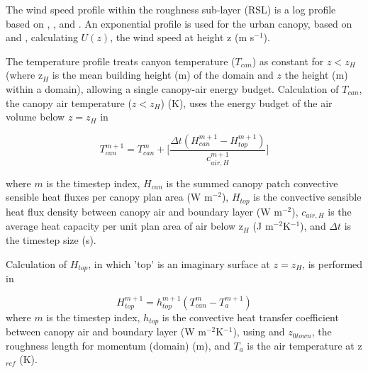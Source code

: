 \documentclass[final,3p,times,authoryear]{elsarticle}
\begin{document}


The wind speed profile within the roughness sub-layer (RSL) is a log profile based on \cite{Masson2000}, \cite{Kusaka2001}, and \cite{Harman2004}. An exponential profile is used for the urban canopy, based on \cite{Masson2000} and \cite{Rotach1995}, calculating $U(z)$, the wind speed at height z (m s$^{-1}$).

\label{sec:tempprof}

The temperature profile treats canyon temperature ($T_{can}$) as constant for $z < z_{H}$ (where z$_{H}$ is the mean building height (m) of the domain and $z$ the height (m) within a domain), allowing a single canopy-air energy budget. Calculation of $T_{can}$, the canopy air temperature ($z < z_{H}$) (K), uses the energy budget of the air volume below $z = z_{H}$ in 

\begin{equation} 
T_{can}^{m+1} = T_{can}^{m} + \Bigg[ \frac{\Delta t(H_{can}^{m+1}-H_{top}^{m+1} )}{c_{air,H}^{m+1}}   \Bigg]
\label{eq:tcan} \end{equation} 

where $m$ is the timestep index,
$H_{can}$ is the summed canopy patch convective sensible heat fluxes per canopy plan area (W m$^{-2}$),
$H_{top}$ is the convective sensible heat flux density between canopy air and boundary layer (W m$^{-2}$),
$c_{air,H}$ is the average heat capacity per unit plan area of air below z$_{H}$ (J m$^{-2}$K$^{-1}$), and
$\Delta t$ is the timestep size (s).

Calculation of $H_{top}$, in which 'top' is an imaginary surface at $z = z_{H}$, is performed in 

\begin{equation} 
H_{top}^{m+1} = h_{top}^{m+1} (T_{can}^{m} - T_{a}^{m+1})
\label{eq:htop} \end{equation} 
where $m$ is the timestep index,
$h_{top}$ is the convective heat transfer coefficient between canopy air and boundary layer (W m$^{-2}$K$^{-1}$), using \cite{Mascart1995} and $z_{0town}$, the roughness length for momentum (domain) (m), and
$T_{a}$ is the air temperature at z$_{ref}$ (K).
\end{document}
